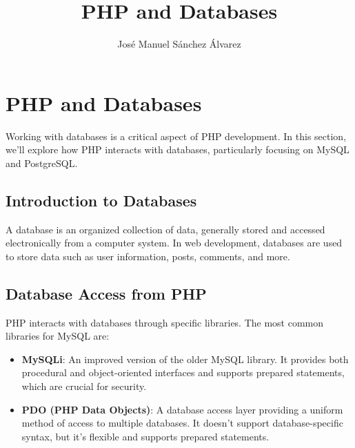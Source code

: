 \documentclass[11pt]{article}
\author{José Manuel Sánchez Álvarez}
\date{}
\title{PHP and Databases}
\begin{document}
\maketitle
\setcounter{tocdepth}{3}
\tableofcontents

\setlength\parindent{10pt}

\section{PHP and Databases}
\label{sec:org263cae5}
Working with databases is a critical aspect of PHP development. In this
section, we'll explore how PHP interacts with databases, particularly
focusing on MySQL and PostgreSQL.

\subsection{Introduction to Databases}
\label{sec:org5b7275e}
A database is an organized collection of data, generally stored and
accessed electronically from a computer system. In web development,
databases are used to store data such as user information, posts,
comments, and more.

\subsection{Database Access from PHP}
\label{sec:org5ab1b16}
PHP interacts with databases through specific libraries. The most common
libraries for MySQL are:

\begin{itemize}
\item \textbf{MySQLi}: An improved version of the older MySQL library. It provides
both procedural and object-oriented interfaces and supports prepared
statements, which are crucial for security.

\item \textbf{PDO (PHP Data Objects)}: A database access layer providing a uniform
method of access to multiple databases. It doesn't support
database-specific syntax, but it's flexible and supports prepared
statements.
\end{itemize}
\end{document}
